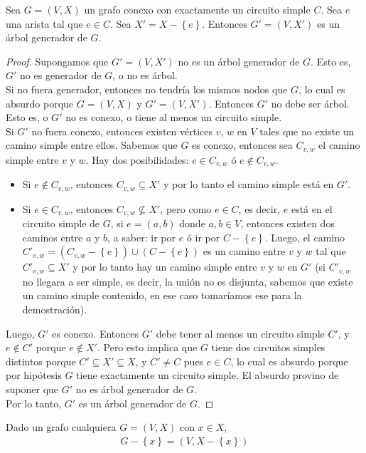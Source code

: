 \begin{lema}
\label{lema_ej3}
Sea $G = (V,X)$ un grafo conexo con exactamente un circuito simple $C$. Sea $e$ una arista tal que $e \in C$. Sea $X' = X - \left\{e\right\}$. Entonces $G' = (V,X')$ es un árbol generador de $G$.
\end{lema}
\begin{proof}
Supongamos que $G' = (V,X')$ no es un árbol generador de $G$. Esto es, $G'$ no es generador de $G$, o no es árbol. \\
Si no fuera generador, entonces no tendría los mismos nodos que $G$, lo cual es absurdo porque $G = (V,X)$ y $G' = (V,X')$.
Entonces $G'$ no debe ser árbol. Esto es, o $G'$ no es conexo, o tiene al menos un circuito simple. \\
Si $G'$ no fuera conexo, entonces existen vértices $v$, $w$ en $V$ tales que no existe un camino simple entre ellos. Sabemos que $G$ es conexo, entonces sea $C_{v,w}$ el camino simple entre $v$ y $w$. Hay dos posibilidades: $e \in C_{v,w}$ ó $e \notin C_{v,w}$. 
\begin{itemize}
\item Si $e \notin C_{v,w}$, entonces $C_{v,w} \subseteq X'$ y por lo tanto el camino simple está en $G'$. 
\item Si $e \in C_{v,w}$, entonces $C_{v,w} \not\subseteq X'$, pero como $e \in C$, es decir, $e$ está en el circuito simple de $G$, si $e = (a,b)$ donde $a, b \in V$, entonces existen dos caminos entre $a$ y $b$, a saber: ir por $e$ ó ir por $C - \left\{e\right\}$. Luego, el camino $C'_{v,w} = (C_{v,w} - \left\{e\right\}) \cup (C - \left\{e\right\})$ es un camino entre $v$ y $w$ tal que $C'_{v,w} \subseteq X'$ y por lo tanto hay un camino simple entre $v$ y $w$ en $G'$ (si $C'_{v,w}$ no llegara a ser simple, es decir, la unión no es disjunta, sabemos que existe un camino simple contenido, en ese caso tomaríamos ese para la demostración).
\end{itemize}
Luego, $G'$ es conexo. Entonces $G'$ debe tener al menos un circuito simple $C'$, y $e \notin C'$ porque $e \notin X'$. Pero esto implica que $G$ tiene dos circuitos simples distintos porque $C' \subseteq X' \subseteq X$, y $C' \neq C$ pues $e \in C$, lo cual es absurdo porque por hipótesis $G$ tiene exactamente un circuito simple. El absurdo provino de suponer que $G'$ no es árbol generador de $G$. \\ Por lo tanto, $G'$ es un árbol generador de $G$.
\end{proof}

\begin{notacion}
Dado un grafo cualquiera $G = (V,X)$ con $x \in X$, 
\begin{align*}
G - \left\{x\right\} = (V, X - \left\{x\right\})
\end{align*}
\end{notacion}

